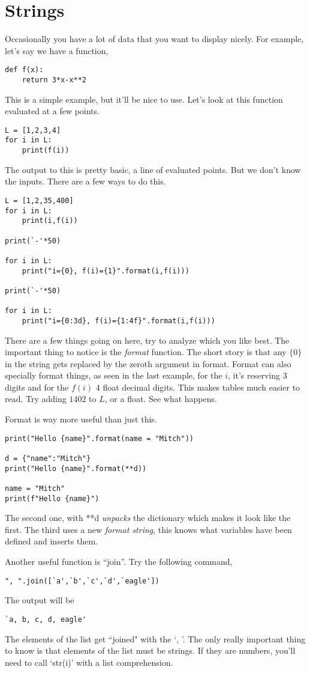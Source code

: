\documentclass[11pt,letterpaper]{article}
\begin{document}
\section{Strings}
Occasionally you have a lot of data that you want to display nicely. For example, let's say we have a 
function,
\begin{verbatim}
def f(x):
    return 3*x-x**2
\end{verbatim}
This is a simple example, but it'll be nice to use. Let's look at this function evaluated at a few points.
\begin{verbatim}
L = [1,2,3,4]
for i in L:
    print(f(i))
\end{verbatim}
The output to this is pretty basic, a line of evaluated points. But we don't know the inputs. There are a few ways to do this.
\begin{verbatim}
L = [1,2,35,400]
for i in L:
    print(i,f(i))

print(`-'*50)

for i in L:
    print("i={0}, f(i)={1}".format(i,f(i)))

print(`-'*50)

for i in L:
    print("i={0:3d}, f(i)={1:4f}".format(i,f(i)))
\end{verbatim}
There are a few things going on here, try to analyze which you like best. The important thing to notice
is the \emph{format} function. The short story is that any $\{0\}$ in the string gets replaced by the
zeroth argument in format. Format can also specially format things, as seen in the last example, for the
$i$, it's reserving 3 digits and for the $f(i)$ 4 float decimal digits. This makes tables much easier to
read. Try adding $1402$ to $L$, or a float. See what happens.
	
Format is way more useful than just this.
\begin{verbatim}
print("Hello {name}".format(name = "Mitch"))

d = {"name":"Mitch"}
print("Hello {name}".format(**d))

name = "Mitch"
print(f"Hello {name}")
\end{verbatim}
The second one, with **d \emph{unpacks} the dictionary which makes it look like the first. The third
uses a new \emph{format string}, this knows what variables have been defined and inserts them. 

Another useful function is ``join''. Try the following command,
\begin{verbatim}
", ".join([`a',`b',`c',`d',`eagle'])
\end{verbatim}
The output will be 
\begin{verbatim}
`a, b, c, d, eagle'
\end{verbatim}
The elements of the list get ``joined" with the `, '. The only really important thing to know is that elements of the list must be strings. If they are numbers, you'll need to call `str(i)' with a list comprehension. 
\end{document}
